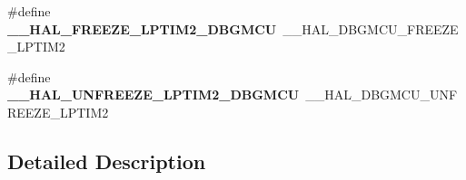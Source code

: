 \begin{DoxyCompactItemize}
\item 
\hypertarget{group___h_a_l___d_b_g_m_c_u___aliased___macros_gad0e137ee9aa05347e1ffde48f9820f34}{\#define {\bfseries \-\_\-\-\_\-\-H\-A\-L\-\_\-\-F\-R\-E\-E\-Z\-E\-\_\-\-L\-P\-T\-I\-M2\-\_\-\-D\-B\-G\-M\-C\-U}~\-\_\-\-\_\-\-H\-A\-L\-\_\-\-D\-B\-G\-M\-C\-U\-\_\-\-F\-R\-E\-E\-Z\-E\-\_\-\-L\-P\-T\-I\-M2}\label{group___h_a_l___d_b_g_m_c_u___aliased___macros_gad0e137ee9aa05347e1ffde48f9820f34}

\item 
\hypertarget{group___h_a_l___d_b_g_m_c_u___aliased___macros_ga7490754801ed1bcaf3e31d15757a883c}{\#define {\bfseries \-\_\-\-\_\-\-H\-A\-L\-\_\-\-U\-N\-F\-R\-E\-E\-Z\-E\-\_\-\-L\-P\-T\-I\-M2\-\_\-\-D\-B\-G\-M\-C\-U}~\-\_\-\-\_\-\-H\-A\-L\-\_\-\-D\-B\-G\-M\-C\-U\-\_\-\-U\-N\-F\-R\-E\-E\-Z\-E\-\_\-\-L\-P\-T\-I\-M2}\label{group___h_a_l___d_b_g_m_c_u___aliased___macros_ga7490754801ed1bcaf3e31d15757a883c}

\end{DoxyCompactItemize}


\subsection{Detailed Description}

